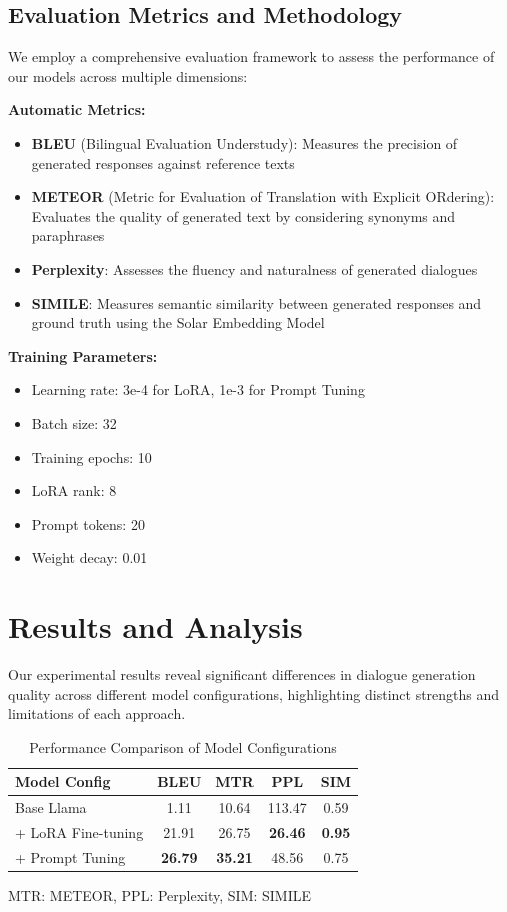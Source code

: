 \documentclass{article}
\begin{document}
\subsection{Evaluation Metrics and Methodology}
We employ a comprehensive evaluation framework to assess the performance of our models across multiple dimensions:

\textbf{Automatic Metrics:}
\begin{itemize}
\item \textbf{BLEU} (Bilingual Evaluation Understudy): Measures the precision of generated responses against reference texts
\item \textbf{METEOR} (Metric for Evaluation of Translation with Explicit ORdering): Evaluates the quality of generated text by considering synonyms and paraphrases
\item \textbf{Perplexity}: Assesses the fluency and naturalness of generated dialogues
\item \textbf{SIMILE}: Measures semantic similarity between generated responses and ground truth using the Solar Embedding Model
\end{itemize}

\textbf{Training Parameters:}
\begin{itemize}
\item Learning rate: 3e-4 for LoRA, 1e-3 for Prompt Tuning
\item Batch size: 32
\item Training epochs: 10
\item LoRA rank: 8
\item Prompt tokens: 20
\item Weight decay: 0.01
\end{itemize}




\section{Results and Analysis}

Our experimental results reveal significant differences in dialogue generation quality across different model configurations, highlighting distinct strengths and limitations of each approach.

\begin{table}[t]
\caption{Performance Comparison of Model Configurations}
\label{tab:model-comparison}
\centering
\begin{tabular}{lcccc}
\toprule
Model Config & BLEU & MTR & PPL & SIM \\
\midrule
Base Llama & 1.11 & 10.64 & 113.47 & 0.59 \\
+ LoRA Fine-tuning & 21.91 & 26.75 & \textbf{26.46} & \textbf{0.95} \\
+ Prompt Tuning & \textbf{26.79} & \textbf{35.21} & 48.56 & 0.75 \\
\bottomrule
\end{tabular}
\smallskip
\begin{flushleft}
\small
MTR: METEOR, PPL: Perplexity, SIM: SIMILE \\
\end{flushleft}
\end{table}
\end{document}
